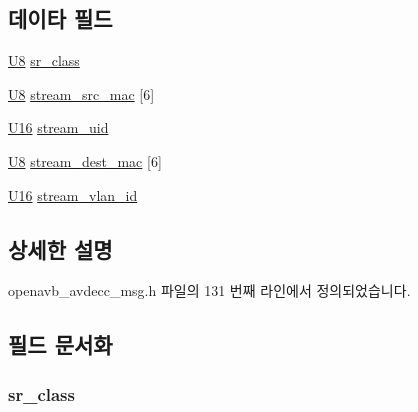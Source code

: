 \subsection*{데이타 필드}
\begin{DoxyCompactItemize}
\item 
\hyperlink{openavb__types__base__pub_8h_aa63ef7b996d5487ce35a5a66601f3e73}{U8} \hyperlink{structopenavb_avdecc_msg_params___listener_stream_i_d__t_a39d4e73b306d801de38536c43ef7a5e8}{sr\+\_\+class}
\item 
\hyperlink{openavb__types__base__pub_8h_aa63ef7b996d5487ce35a5a66601f3e73}{U8} \hyperlink{structopenavb_avdecc_msg_params___listener_stream_i_d__t_ab9d3cf41d938e8795e395632cea06e77}{stream\+\_\+src\+\_\+mac} \mbox{[}6\mbox{]}
\item 
\hyperlink{openavb__types__base__pub_8h_a0a0a322d5fa4a546d293a77ba8b4a71f}{U16} \hyperlink{structopenavb_avdecc_msg_params___listener_stream_i_d__t_a511b2a26fe61b945ced1dd0bab9f2d1b}{stream\+\_\+uid}
\item 
\hyperlink{openavb__types__base__pub_8h_aa63ef7b996d5487ce35a5a66601f3e73}{U8} \hyperlink{structopenavb_avdecc_msg_params___listener_stream_i_d__t_a26087f365a751a1415364bfb5e2b8a0e}{stream\+\_\+dest\+\_\+mac} \mbox{[}6\mbox{]}
\item 
\hyperlink{openavb__types__base__pub_8h_a0a0a322d5fa4a546d293a77ba8b4a71f}{U16} \hyperlink{structopenavb_avdecc_msg_params___listener_stream_i_d__t_a31db70d552fc6f5d35875430fca593e6}{stream\+\_\+vlan\+\_\+id}
\end{DoxyCompactItemize}


\subsection{상세한 설명}


openavb\+\_\+avdecc\+\_\+msg.\+h 파일의 131 번째 라인에서 정의되었습니다.



\subsection{필드 문서화}
\subsubsection[{\texorpdfstring{sr\+\_\+class}{sr_class}}]{ sr\+\_\+class}\hypertarget{structopenavb_avdecc_msg_params___listener_stream_i_d__t_a39d4e73b306d801de38536c43ef7a5e8}{}\label{structopenavb_avdecc_msg_params___listener_stream_i_d__t_a39d4e73b306d801de38536c43ef7a5e8}


